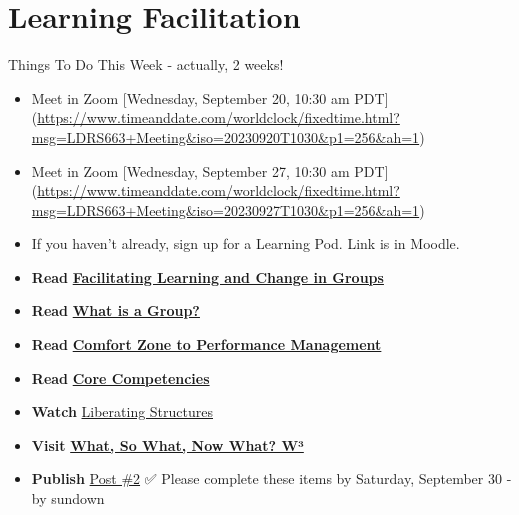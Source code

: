 \documentclass[
]{book}
\providecommand{\tightlist}{%
  \setlength{\itemsep}{0pt}\setlength{\parskip}{0pt}}
\begin{document}
\hypertarget{learning-facilitation}{%
\chapter{Learning Facilitation}\label{learning-facilitation}}

\begin{feedback}
{Things To Do This Week - actually, 2 weeks!}

\begin{itemize}
\tightlist
\item
  Meet in Zoom {{[}Wednesday, September 20, 10:30 am PDT{]}}(\url{https://www.timeanddate.com/worldclock/fixedtime.html?msg=LDRS663+Meeting\&iso=20230920T1030\&p1=256\&ah=1})\\
\item
  Meet in Zoom {{[}Wednesday, September 27, 10:30 am PDT{]}}(\url{https://www.timeanddate.com/worldclock/fixedtime.html?msg=LDRS663+Meeting\&iso=20230927T1030\&p1=256\&ah=1})\\
\item
  If you haven't already, sign up for a Learning Pod. Link is in Moodle.
\item
  \textbf{Read} \href{https://infed.org/mobi/facilitating-learning-and-change-in-groups-and-group-sessions/}{\textbf{Facilitating Learning and Change in Groups}}\\
\item
  \textbf{Read} \href{https://infed.org/mobi/what-is-a-group/}{\textbf{What is a Group?}}\\
\item
  \textbf{Read} \href{https://www.researchgate.net/publication/228957278_From_Comfort_Zone_to_Performance_Management}{\textbf{Comfort Zone to Performance Management}}\\
\item
  \textbf{Read} \href{https://www.iaf-world.org/site/professional/core-competencies}{\textbf{Core Competencies}}\\
\item
  \textbf{Watch} \href{https://player.vimeo.com/video/364868276}{Liberating Structures}\\
\item
  \textbf{Visit} \href{http://www.liberatingstructures.com/9-what-so-what-now-what-w/}{\textbf{What, So What, Now What? W³}}\\
\item
  \textbf{Publish} \href{https://ma-lead.github.io/ldrs663/assessments.html\#post-2}{Post \#2}
  ✅ Please complete these items by {Saturday, September 30 - by sundown}
\end{itemize}
\end{feedback}
\end{document}
